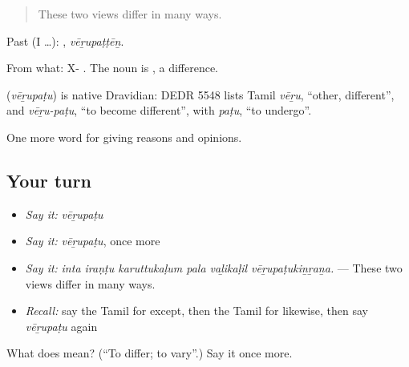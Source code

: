 \begin{quote}
These two views differ in many ways.
\end{quote}

Past (I …): , \emph{vēṟupaṭṭēṉ}.

From what: X- . The noun is , a difference.

\begin{cousinweb}
\textbf{} (\emph{vēṟupaṭu}) is native Dravidian: DEDR 5548 lists Tamil \emph{vēṟu}, \textquotedblleft{}other, different\textquotedblright{}, and \emph{vēṟu-paṭu}, \textquotedblleft{}to become different\textquotedblright{}, with \emph{paṭu}, \textquotedblleft{}to undergo\textquotedblright{}.
\end{cousinweb}

\begin{grammarlens}[title={What you've built}]
One more word for giving reasons and opinions.
\end{grammarlens}

\subsection*{Your turn}
\begin{itemize}
\raggedright
  \item \emph{Say it:} \emph{vēṟupaṭu}
  \item \emph{Say it:} \emph{vēṟupaṭu}, once more
  \item \emph{Say it:} \emph{inta iraṇṭu karuttukaḷum pala vaḻikaḷil vēṟupaṭukiṉṟaṉa.} — These two views differ in many ways.
  \item \emph{Recall:} say the Tamil for except, then the Tamil for likewise, then say \emph{vēṟupaṭu} again
\end{itemize}

\begin{tcolorbox}[breakable,colback=teal!4,colframe=teal!35!black,title={Before you move on}]
What does  mean? (\textquotedblleft{}To differ; to vary\textquotedblright{}.) Say it once more.
\end{tcolorbox}
